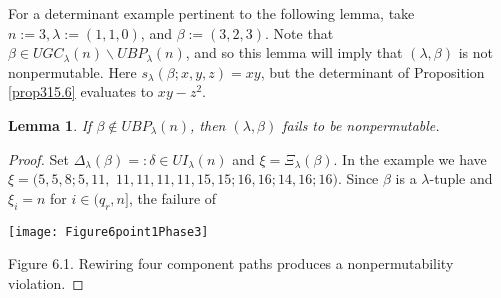 \documentclass[11pt]{article}
\newtheorem{lem}[thm]{Lemma}
\theoremstyle{definition}
\theoremstyle{remark}
\numberwithin{equation}{section}
\begin{document}
\begin{spacing}{1.35}
For a determinant example pertinent to the following lemma, take $n := 3, \lambda := (1,1,0)$, and $\beta := (3,2,3)$.  Note that $\beta \in UGC_\lambda(n) \backslash UBP_\lambda(n)$, and so this lemma will imply that $(\lambda, \beta)$ is not nonpermutable.  Here $s_\lambda(\beta;x,y,z) = xy$, but the determinant of Proposition \ref{prop315.6} evaluates to $xy - z^2$.

\begin{lem}\label{lemma434.5}If $\beta \notin UBP_\lambda(n)$, then $(\lambda, \beta)$ fails to be nonpermutable.  \end{lem}

\begin{proof}Set $\Delta_\lambda(\beta) =: \delta \in UI_\lambda(n)$ and $\xi = \Xi_\lambda(\beta)$.  In the example we have $\xi = (5,5,8;5,11,$ $11,11,11,11,15,15;16,16;14,16;16)$. Since $\beta$ is a $\lambda$-tuple and $\xi_i = n$ for $i \in (q_r,n]$, the failure of 

\centerline{\texttt{[image: Figure6point1Phase3]}}

\vspace{0.5pc}\centerline{Figure 6.1.  Rewiring four component paths produces a nonpermutability violation.}




\end{proof}
\end{spacing}
\end{document}
